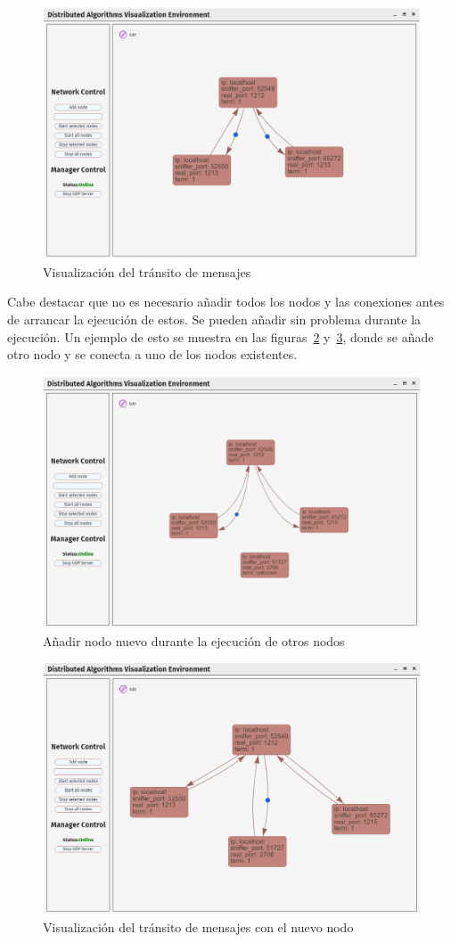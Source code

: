 \begin{figure}[p]
  \centering
  \includegraphics[width=0.9\linewidth]{imagenes/ui6}
  \caption{Visualización del tránsito de mensajes}
  \label{fig:ui6}
\end{figure}

Cabe destacar que no es necesario añadir todos los nodos y las conexiones antes de arrancar la ejecución de estos. Se pueden añadir sin problema durante la ejecución. Un ejemplo de esto se muestra en las figuras~\ref{fig:ui7} y~\ref{fig:ui8}, donde se añade otro nodo y se conecta a uno de los nodos existentes.

\begin{figure}[p]
  \centering
  \includegraphics[width=0.9\linewidth]{imagenes/ui7}
  \caption{Añadir nodo nuevo durante la ejecución de otros nodos}
  \label{fig:ui7}
\end{figure}

\begin{figure}[p]
  \centering
  \includegraphics[width=0.9\linewidth]{imagenes/ui8}
  \caption{Visualización del tránsito de mensajes con el nuevo nodo}
  \label{fig:ui8}
\end{figure}
